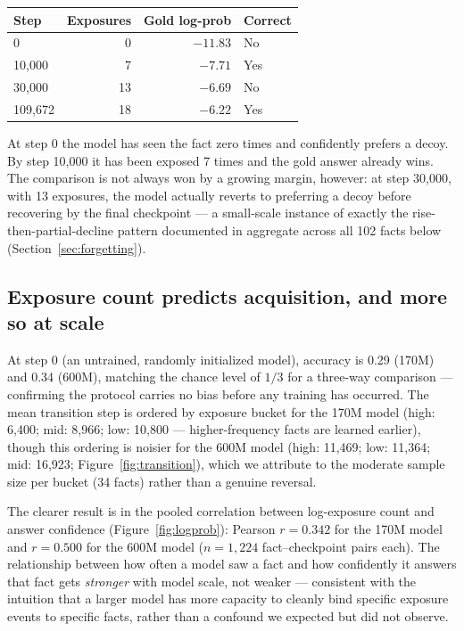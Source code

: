 \documentclass[11pt]{article}
\begin{document}
\begin{center}
\small
\begin{tabular}{@{}lrrl@{}}
\toprule
Step & Exposures & Gold log-prob & Correct \\
\midrule
0      & 0  & $-11.83$ & No  \\
10{,}000  & 7  & $-7.71$  & Yes \\
30{,}000  & 13 & $-6.69$  & No  \\
109{,}672 & 18 & $-6.22$  & Yes \\
\bottomrule
\end{tabular}
\end{center}

At step 0 the model has seen the fact zero times and confidently prefers a decoy. By step 10{,}000 it has been exposed 7 times and the gold answer already wins. The comparison is not always won by a growing margin, however: at step 30{,}000, with 13 exposures, the model actually reverts to preferring a decoy before recovering by the final checkpoint --- a small-scale instance of exactly the rise-then-partial-decline pattern documented in aggregate across all 102 facts below (Section~\ref{sec:forgetting}).

\subsection{Exposure count predicts acquisition, and more so at scale}
At step 0 (an untrained, randomly initialized model), accuracy is 0.29 (170M) and 0.34 (600M), matching the chance level of $1/3$ for a three-way comparison --- confirming the protocol carries no bias before any training has occurred. The mean transition step is ordered by exposure bucket for the 170M model (high: 6{,}400; mid: 8{,}966; low: 10{,}800 --- higher-frequency facts are learned earlier), though this ordering is noisier for the 600M model (high: 11{,}469; low: 11{,}364; mid: 16{,}923; Figure~\ref{fig:transition}), which we attribute to the moderate sample size per bucket (34 facts) rather than a genuine reversal.

The clearer result is in the pooled correlation between log-exposure count and answer confidence (Figure~\ref{fig:logprob}): Pearson $r = 0.342$ for the 170M model and $r = 0.500$ for the 600M model ($n=1{,}224$ fact--checkpoint pairs each). The relationship between how often a model saw a fact and how confidently it answers that fact gets \emph{stronger} with model scale, not weaker --- consistent with the intuition that a larger model has more capacity to cleanly bind specific exposure events to specific facts, rather than a confound we expected but did not observe.
\end{document}
